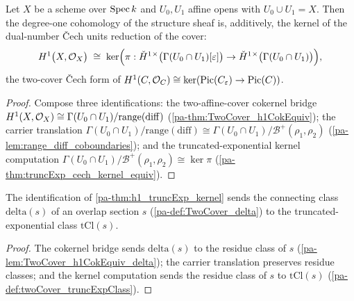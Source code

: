 \begin{theorem}
  \label{pa-thm:h1_truncExp_kernel}
  \leanok

  Let \(X\) be a scheme over \(\operatorname{Spec} k\) and \(U_0, U_1\) affine opens with
  \(U_0 \cup U_1 = X\). Then the degree-one cohomology of the structure sheaf is,
  additively, the kernel of the dual-number \v{C}ech units reduction of the cover:
  \[
    H^1\bigl(X, \mathcal{O}_{X}\bigr) \;\cong\;
    \ker\Bigl( \pi :
      \check H^1{}^\times\bigl(\Gamma(U_0 \cap U_1)[\varepsilon]\bigr) \to
      \check H^1{}^\times\bigl(\Gamma(U_0 \cap U_1)\bigr) \Bigr),
  \]
  the two-cover \v{C}ech form of
  \(H^1(C, \mathcal{O}_{C}) \cong \ker(\operatorname{Pic}(C_\varepsilon) \to \operatorname{Pic}(C))\).
\end{theorem}
\begin{proof}
  \leanok
  Compose three identifications: the two-affine-cover cokernel bridge
  \(H^1(X, \mathcal{O}_{X}) \cong \Gamma(U_0 \cap U_1)/\mathrm{range}(\mathrm{diff})\)
  (\ref{pa-thm:TwoCover_h1CokEquiv}); the carrier translation
  \(\Gamma(U_0 \cap U_1)/\mathrm{range}(\mathrm{diff}) \cong
  \Gamma(U_0 \cap U_1)/\mathcal B^+(\rho_1, \rho_2)\)
  (\ref{pa-lem:range_diff_coboundaries}); and the truncated-exponential kernel computation
  \(\Gamma(U_0 \cap U_1)/\mathcal B^+(\rho_1, \rho_2) \cong \ker \pi\)
  (\ref{pa-thm:truncExp_cech_kernel_equiv}).
\end{proof}

\begin{lemma}
  \label{pa-lem:h1_truncExp_kernel_delta}
  \leanok

  The identification of \ref{pa-thm:h1_truncExp_kernel} sends the connecting class
  \(\mathrm{delta}(s)\) of an overlap section \(s\) (\ref{pa-def:TwoCover_delta}) to the
  truncated-exponential class \(\mathrm{tCl}(s)\).
\end{lemma}
\begin{proof}
  \leanok
  The cokernel bridge sends \(\mathrm{delta}(s)\) to the residue class of \(s\)
  (\ref{pa-lem:TwoCover_h1CokEquiv_delta}); the carrier translation preserves residue
  classes; and the kernel computation sends the residue class of \(s\) to
  \(\mathrm{tCl}(s)\) (\ref{pa-def:twoCover_truncExpClass}).
\end{proof}

